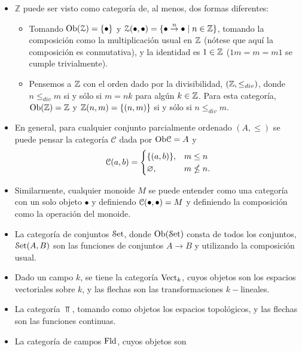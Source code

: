 \begin{example}\leavevmode
\begin{itemize}
    \item $\mathbb{Z}$ puede ser visto como categoría de, al
    menos, dos formas diferentes:
        \begin{itemize}
            \item Tomando $\Ob(\cal Z)=\{\bullet\}$ y
            $\cal
            Z(\bullet,\bullet)=\{\bullet\overset{n}{\to}\bullet\mid
            n\in\Z\}$, tomando la composición como la
            multiplicación usual en $\Z$ (nótese que aquí
            la composición es conmutativa),
            y la identidad es $1\in\Z$ ($1m=m=m1$
            se cumple trivialmente).
            \item Pensemos a $\Z$ con el orden dado por la divisibilidad, $(\Z, \leq_{div})$, donde $n\leq_{div}m$ si y sólo si $m=nk$ para algún $k\in \Z$.
            Para esta categoría, $\Ob(\Z)=\Z$ y
            $\Z(n,m)=\{(n,m)\}$ si y sólo si $n\leq_{div}m$.
        \end{itemize}
        \item En general, para cualquier conjunto parcialmente ordenado $(A,\leq)$ se puede pensar la categoría $\mathcal{C}$ dada por $\Ob\cal C=A$ y 
        \[
        \cal C(a,b) =
        \begin{cases}
            \{(a,b)\}, & m\leq n \\
            \emptyset, & m\nleq n.
        \end{cases}
        \]
        \item Similarmente, cualquier monoide $M$ se puede
        entender como una categoría con un solo objeto $\bullet$
        y definiendo $\cal C(\bullet,\bullet)=M$ y definiendo la
        composición como la operación del monoide.
        \item La categoría de conjuntos $\Con$, donde $\Ob(\Con)$
        consta de todos los conjuntos, $\Con(A,B)$ son las
        funciones de conjuntos $A\to B$ y utilizando la
        composición usual.
        \item Dado un campo $k$, se tiene la categoría $\Vect_k$,
        cuyos objetos son los espacios vectoriales sobre $k$, y
        las flechas son las transformaciones $k-$lineales.
        \item La categoría $\Top$, tomando como objetos los
        espacios topológicos, y las flechas son las funciones
        continuas.
        \item La categoría de campos $\Fld$, cuyos objetos son

\end{itemize}
\end{example}
